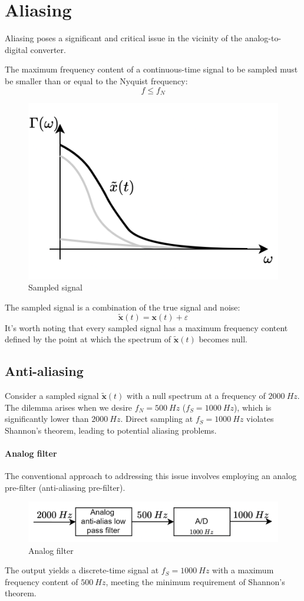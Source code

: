 \section{Aliasing}

Aliasing poses a significant and critical issue in the vicinity of the analog-to-digital converter.
\begin{theorem}[Shannon]
    The maximum frequency content of a continuous-time signal to be sampled must be smaller than or equal to the Nyquist frequency:
    \[f\leq f_N\]
\end{theorem}
\begin{figure}[H]
    \centering
    \includegraphics[width=0.4\linewidth]{images/noise.png}
    \caption{Sampled signal}
\end{figure}
The sampled signal is a combination of the true signal and noise:
\[\tilde{\mathbf{x}}(t)=\mathbf{x}(t)+\varepsilon\]
It's worth noting that every sampled signal has a maximum frequency content defined by the point at which the spectrum of $\tilde{\mathbf{x}}(t)$ becomes null.

\subsection{Anti-aliasing}
Consider a sampled signal $\tilde{\mathbf{x}}(t)$  with a null spectrum at a frequency of $2000\:Hz$. 
The dilemma arises when we desire $f_N=500\:Hz$ ($f_S=1000\:Hz$), which is significantly lower than  $2000\:Hz$. 
Direct sampling at $f_S=1000\:Hz$ violates Shannon's theorem, leading to potential aliasing problems.

\paragraph*{Analog filter}
The conventional approach to addressing this issue involves employing an analog pre-filter (anti-aliasing pre-filter).
\begin{figure}[H]
    \centering
    \includegraphics[width=0.7\linewidth]{images/alias.png}
    \caption{Analog filter}
\end{figure}
The output yields a discrete-time signal at $f_S=1000\:Hz$ with a maximum frequency content of $500\:Hz$, meeting the minimum requirement of Shannon's theorem.

